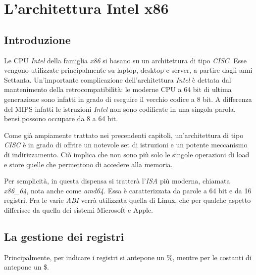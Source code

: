 \documentclass[class=book, crop=false, oneside]{standalone}
\begin{document}
\chapter{L'architettura Intel x86}

\section{Introduzione}
Le CPU \emph{Intel} della famiglia \emph{x86} si basano su un architettura di tipo \emph{CISC}. Esse vengono utilizzate principalmente su laptop, desktop e server, a partire dagli anni Settanta. Un'importante complicazione dell'architettura \emph{Intel} è dettata dal mantenimento della retrocompatibilità: le moderne CPU a 64 bit di ultima generazione sono infatti in grado di eseguire il vecchio codice a 8 bit. A differenza del MIPS infatti le istruzioni \emph{Intel} non sono codificate in una singola parola, bensì possono occupare da 8 a 64 bit.

Come già ampiamente trattato nei precendenti capitoli, un'architettura di tipo \emph{CISC} è in grado di offrire un notevole set di istruzioni e un potente meccanismo di indirizzamento. Ciò implica che non sono più solo le singole operazioni di load e store quelle che permettono di accedere alla memoria.

Per semplicità, in questa dispensa si tratterà l'\emph{ISA} più moderna, chiamata \emph{x86\_64}, nota anche come \emph{amd64}. Essa è caratterizzata da parole a 64 bit e da 16 registri. Fra le varie \emph{ABI} verrà utilizzata quella di Linux, che per qualche aspetto differisce da quella dei sistemi Microsoft e Apple.

\section{La gestione dei registri}
Principalmente, per indicare i registri si antepone un \%, mentre per le costanti di antepone un \$.

\end{document}
